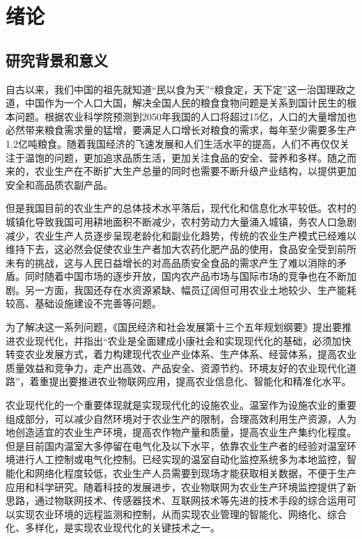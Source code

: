 

\chapter{绪论}
\label{chapter:Introduction}

\section{研究背景和意义}
自古以来，我们中国的祖先就知道“民以食为天”“粮食定，天下定”这一治国理政之道\supercite{ChenYunWenXuan}，中国作为一个人口大国，解决全国人民的粮食食物问题是关系到国计民生的根本问题。根据农业科学院预测到2050年我国的人口将超过15亿，人口的大量增加也必然带来粮食需求量的猛增，要满足人口增长对粮食的需求，每年至少需要多生产1.2亿吨粮食。随着我国经济的飞速发展和人们生活水平的提高，人们不再仅仅关注于温饱的问题，更加追求品质生活，更加关注食品的安全、营养和多样\supercite{FengZhiming2007,ZhaoQiguo2011}。随之而来的，农业生产在不断扩大生产总量的同时也需要不断升级产业结构，以提供更加安全和高品质农副产品。

但是我国目前的农业生产的总体技术水平落后，现代化和信息化水平较低。农村的城镇化导致我国可用耕地面积不断减少，农村劳动力大量涌入城镇\supercite{YuJunli2001}，务农人口急剧减少，农业生产人员逐步呈现老龄化和副业化趋势\supercite{LuoChaobin2005}，传统的农业生产模式已经难以维持下去，这必然会促使农业生产者加大农药化肥产品的使用，食品安全受到前所未有的挑战，这与人民日益增长的对高品质安全食品的需求产生了难以消除的矛盾。同时随着中国市场的逐步开放，国内农产品市场与国际市场的竞争也在不断加剧。另一方面，我国还存在水资源紧缺、幅员辽阔但可用农业土地较少、生产能耗较高、基础设施建设不完善等问题。

为了解决这一系列问题，《国民经济和社会发展第十三个五年规划纲要》提出要推进农业现代化，并指出“农业是全面建成小康社会和实现现代化的基础，必须加快转变农业发展方式，着力构建现代农业产业体系、生产体系、经营体系，提高农业质量效益和竞争力，走产出高效、产品安全、资源节约、环境友好的农业现代化道路”，着重提出要推进农业物联网应用，提高农业信息化、智能化和精准化水平。

农业现代化的一个重要体现就是实现现代化的设施农业\supercite{LiuLei2013}。温室作为设施农业的重要组成部分，可以减少自然环境对于农业生产的限制，合理高效利用生产资源，人为地创造适宜的农业生产环境，提高农作物产量和质量，提高农业生产集约化程度。但是目前国内温室大多停留在电气化及以下水平，依靠农业生产者的经验对温室环境进行人工控制或电气化控制。已经实现的温室自动化监控系统多为本地监控，智能化和网络化程度较低，农业生产人员需要到现场才能获取相关数据，不便于生产应用和科学研究\supercite{duodiandapeng}。随着科技的发展进步，农业物联网为农业生产环境监控提供了新思路，通过物联网技术、传感器技术、互联网技术等先进的技术手段的综合运用可以实现农业环境的远程监测和控制，从而实现农业管理的智能化、网络化、综合化、多样化，是实现农业现代化的关键技术之一\supercite{JiYuWuLianWang,WuLianWang,ZhongGuoSheShiNongYe}。

